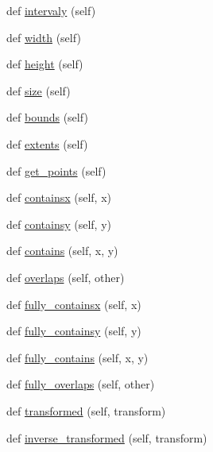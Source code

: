 \begin{DoxyCompactItemize}
def \hyperlink{classmatplotlib_1_1transforms_1_1BboxBase_a9d3fa6e44a8977f184703fc236c318e3}{intervaly} (self)
\item 
def \hyperlink{classmatplotlib_1_1transforms_1_1BboxBase_adf5b955aae1307fb4541cdcc5bd7acf2}{width} (self)
\item 
def \hyperlink{classmatplotlib_1_1transforms_1_1BboxBase_acec125d4af62a957effbc684a26e5ce2}{height} (self)
\item 
def \hyperlink{classmatplotlib_1_1transforms_1_1BboxBase_ac259d06a033400fdd58b8ba87522a796}{size} (self)
\item 
def \hyperlink{classmatplotlib_1_1transforms_1_1BboxBase_a40f28fe572af6ed7412d2e436910614e}{bounds} (self)
\item 
def \hyperlink{classmatplotlib_1_1transforms_1_1BboxBase_aab8734d93810dcaf4c1968da90e0bc73}{extents} (self)
\item 
def \hyperlink{classmatplotlib_1_1transforms_1_1BboxBase_a428f15c7c6d900adabd7230033841bfc}{get\+\_\+points} (self)
\item 
def \hyperlink{classmatplotlib_1_1transforms_1_1BboxBase_a4cd47b41ddb42b19c5bf487387f53b4a}{containsx} (self, x)
\item 
def \hyperlink{classmatplotlib_1_1transforms_1_1BboxBase_a1ef84b63d399486aea2da35a931d794d}{containsy} (self, y)
\item 
def \hyperlink{classmatplotlib_1_1transforms_1_1BboxBase_a728ccbd561906f846adb7cb417d4d548}{contains} (self, x, y)
\item 
def \hyperlink{classmatplotlib_1_1transforms_1_1BboxBase_a9d4c1134c2e1ea21f0703facd163c87c}{overlaps} (self, other)
\item 
def \hyperlink{classmatplotlib_1_1transforms_1_1BboxBase_a6147bd3ab9a9a00e2641c0b68f28851f}{fully\+\_\+containsx} (self, x)
\item 
def \hyperlink{classmatplotlib_1_1transforms_1_1BboxBase_a76bb64e8436e0f57c423009b67e8b754}{fully\+\_\+containsy} (self, y)
\item 
def \hyperlink{classmatplotlib_1_1transforms_1_1BboxBase_a1b3ce8fe18070b2ec03aad89c87c2af2}{fully\+\_\+contains} (self, x, y)
\item 
def \hyperlink{classmatplotlib_1_1transforms_1_1BboxBase_ad75fbc7b3be5cf99ac355ae8aed1b95c}{fully\+\_\+overlaps} (self, other)
\item 
def \hyperlink{classmatplotlib_1_1transforms_1_1BboxBase_a5044b5b4541d90c222898fc842975bab}{transformed} (self, transform)
\item 
def \hyperlink{classmatplotlib_1_1transforms_1_1BboxBase_aa8e2023b9deac46c52efbbc21c50df63}{inverse\+\_\+transformed} (self, transform)

\end{DoxyCompactItemize}
